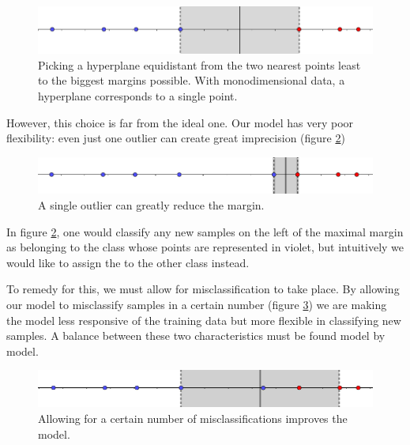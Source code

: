 \documentclass[a4paper]{report}
\begin{document}
\begin{figure} [H]
    \centering
    \includegraphics [width=\textwidth ]{svm/1dim_disq.png}
    \caption{Picking a hyperplane equidistant from the two nearest points least to the biggest margins possible. With monodimensional data, a hyperplane corresponds to a single point.}
    \label{1dim1_disq}
\end{figure}

However, this choice is far from the ideal one.
Our model has very poor flexibility:
even just one outlier can create great imprecision (figure \ref{1dim_disq2})


\begin{figure} [H]
    \centering
    \includegraphics [width=\textwidth ]{svm/1dim_disq2.png}
    \caption{A single outlier can greatly reduce the margin.}
    \label{1dim_disq2}
\end{figure}

In figure \ref{1dim_disq2}, one would classify any new samples on the left of the maximal margin as belonging to the class whose points are represented in violet, but intuitively we would like to assign the to the other class instead.

To remedy for this, we must allow for misclassification to take place.
By allowing our model to misclassify samples in a certain number (figure \ref{1dim_alw}) we are making the model less responsive of the training data but more flexible in classifying new samples.
A balance between these two characteristics must be found model by model.

\begin{figure} [H]
    \centering
    \includegraphics [width=\textwidth ]{svm/1dim_alw.png}
    \caption{Allowing for a certain number of  misclassifications improves the model.}
    \label{1dim_alw}
\end{figure}
\end{document}
